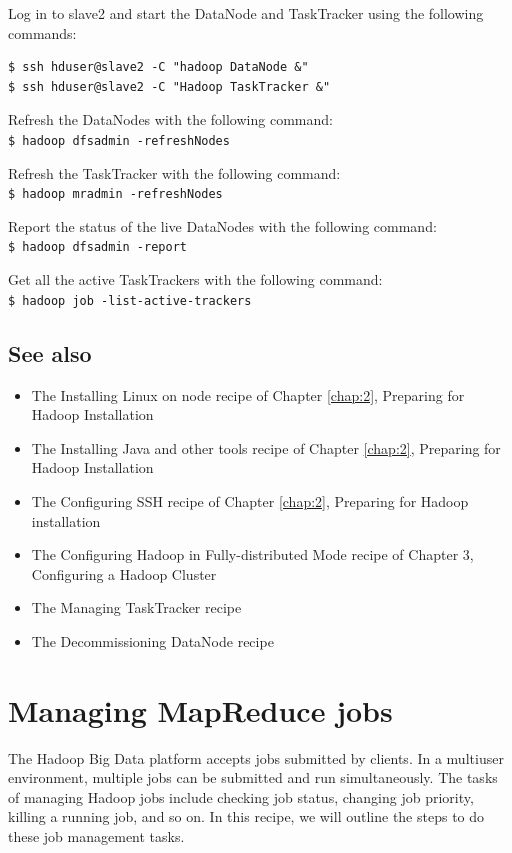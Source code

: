 Log in to slave2 and start the DataNode and TaskTracker using the following commands: 
\begin{verbatim}
$ ssh hduser@slave2 -C "hadoop DataNode &"
$ ssh hduser@slave2 -C "Hadoop TaskTracker &" 
\end{verbatim}

Refresh the DataNodes with the following command: \\
\verb|$ hadoop dfsadmin -refreshNodes|

Refresh the TaskTracker with the following command: \\
\verb|$ hadoop mradmin -refreshNodes|

Report the status of the live DataNodes with the following command: \\
\verb|$ hadoop dfsadmin -report|

Get all the active TaskTrackers with the following command: \\
\verb|$ hadoop job -list-active-trackers|

\subsection*{See also}
\begin{itemize}
  \item The Installing Linux on node recipe of Chapter \ref{chap:2}, Preparing for Hadoop Installation
  \item The Installing Java and other tools recipe of Chapter \ref{chap:2}, Preparing for Hadoop Installation
  \item The Configuring SSH recipe of Chapter \ref{chap:2}, Preparing for Hadoop installation
  \item The Configuring Hadoop in Fully-distributed Mode recipe of Chapter 3, Configuring a Hadoop Cluster
  \item The Managing TaskTracker recipe
  \item The Decommissioning DataNode recipe
\end{itemize}

\section{Managing MapReduce jobs}
The Hadoop Big Data platform accepts jobs submitted by clients. In a multiuser environment, multiple jobs can be submitted and run simultaneously. The tasks of managing Hadoop jobs include checking job status, changing job priority, killing a running job, and so on. In this recipe, we will outline the steps to do these job management tasks.
